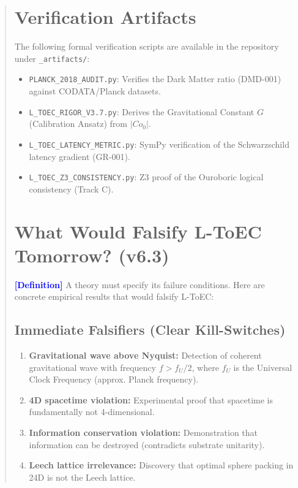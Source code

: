 \documentclass[11pt,titlepage]{article}
\newcommand{\tagdef}{\textcolor{blue}{\textbf{[Definition]}} }
\begin{document}
\begin{abstract}
\section{Verification Artifacts}
The following formal verification scripts are available in the repository under \texttt{\_artifacts/}:
\begin{itemize}
    
\item \texttt{PLANCK\_2018\_AUDIT.py}: Verifies the Dark Matter ratio (DMD-001) against CODATA/Planck datasets.
    
\item \texttt{L\_TOEC\_RIGOR\_V3.7.py}: Derives the Gravitational Constant $G$ (Calibration Ansatz) from $|Co_0|$.
    
\item \texttt{L\_TOEC\_LATENCY\_METRIC.py}: SymPy verification of the Schwarzschild latency gradient (GR-001).
    
\item \texttt{L\_TOEC\_Z3\_CONSISTENCY.py}: Z3 proof of the Ouroboric logical consistency (Track C).
\end{itemize}






\section{What Would Falsify L-ToEC Tomorrow? (v6.3)}
\tagdef A theory must specify its failure conditions. Here are concrete empirical results that would falsify L-ToEC:

\subsection{Immediate Falsifiers (Clear Kill-Switches)}
\begin{enumerate}
\item \textbf{Gravitational wave above Nyquist:} Detection of coherent gravitational wave with frequency $f > f_U/2$, where $f_U$ is the Universal Clock Frequency (approx. Planck frequency).
\item \textbf{4D spacetime violation:} Experimental proof that spacetime is fundamentally not 4-dimensional.
\item \textbf{Information conservation violation:} Demonstration that information can be destroyed (contradicts substrate unitarity).
\item \textbf{Leech lattice irrelevance:} Discovery that optimal sphere packing in 24D is not the Leech lattice.
\end{enumerate}


\end{abstract}
\end{document}
